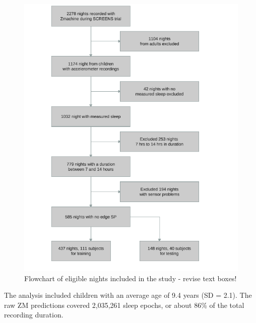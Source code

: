 \documentclass[
  super,
  preprint,
  3p]{elsarticle}
\begin{document}
\begin{figure}[b]

{\centering \includegraphics{visuals/flowchart_of_elligible_nights.pdf}

}

\caption{Flowchart of eligible nights included in the study - revise
text boxes!}

\end{figure}

The analysis included children with an average age of 9.4 years (SD =
2.1). The raw ZM predictions covered 2,035,261 sleep epochs, or about
86\% of the total recording duration.
\end{document}
